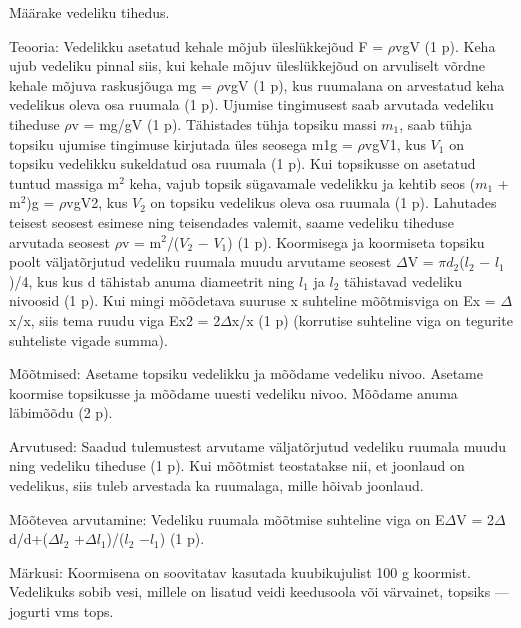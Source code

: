 
Määrake vedeliku tihedus.

\hint

\solu
Teooria: Vedelikku asetatud kehale mõjub üleslükkejõud F = $\rho$vgV (1 p). Keha ujub vedeliku pinnal siis, kui kehale mõjuv üleslükkejõud on arvuliselt võrdne kehale mõjuva raskusjõuga mg = $\rho$vgV (1 p), kus ruumalana on arvestatud keha vedelikus oleva osa ruumala (1 p). Ujumise tingimusest saab arvutada vedeliku tiheduse $\rho$v = mg/gV (1 p). Tähistades tühja topsiku massi $m_1$, saab tühja topsiku ujumise tingimuse kirjutada üles seosega m1g = $\rho$vgV1, kus $V_1$ on topsiku vedelikku sukeldatud osa ruumala (1 p). Kui topsikusse on asetatud tuntud massiga m$^2$ keha, vajub topsik sügavamale vedelikku ja kehtib seos ($m_1$ + m$^2$)g = $\rho$vgV2, kus $V_2$ on topsiku vedelikus oleva osa ruumala (1 p). Lahutades teisest seosest esimese ning teisendades valemit, saame vedeliku tiheduse arvutada seosest $\rho$v = m$^2$/($V_2$ $-$ $V_1$) (1 p). Koormisega ja koormiseta topsiku poolt väljatõrjutud vedeliku ruumala muudu arvutame seosest $\Delta$V = $\pi$$d_2$($l_2$ $-$ $l_1$)/4, kus kus d tähistab anuma diameetrit ning $l_1$ ja $l_2$ tähistavad vedeliku nivoosid (1 p). Kui mingi mõõdetava suuruse x suhteline mõõtmisviga on Ex = $\Delta$x/x, siis tema ruudu viga Ex2 = 2$\Delta$x/x (1 p) (korrutise suhteline viga on tegurite suhteliste vigade summa).

Mõõtmised: Asetame topsiku vedelikku ja mõõdame vedeliku nivoo. Asetame koormise topsikusse ja mõõdame uuesti vedeliku nivoo. Mõõdame anuma läbimõõdu (2 p).

Arvutused: Saadud tulemustest arvutame väljatõrjutud vedeliku ruumala muudu ning vedeliku tiheduse (1 p). Kui mõõtmist teostatakse nii, et joonlaud on vedelikus, siis tuleb arvestada ka ruumalaga, mille hõivab joonlaud.

Mõõtevea arvutamine: Vedeliku ruumala mõõtmise suhteline viga on E$\Delta$V = 2$\Delta$d/d+($\Delta$$l_2$ +$\Delta$$l_1$)/($l_2$ $-$$l_1$) (1 p).

Märkusi: Koormisena on soovitatav kasutada kuubikujulist 100 g koormist. Vedelikuks sobib vesi, millele on lisatud veidi keedusoola või värvainet, topsiks --- jogurti vms tops.
\probend

